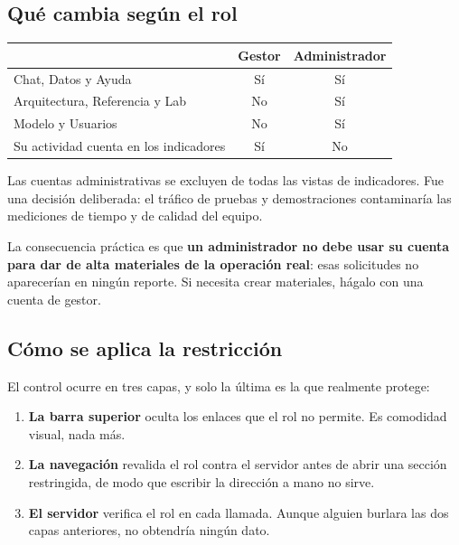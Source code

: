 \subsection{Qué cambia según el rol}

\begin{center}
\begin{tabular}{@{}lcc@{}}
\toprule
 & \textbf{Gestor} & \textbf{Administrador} \\
\midrule
Chat, Datos y Ayuda                & Sí & Sí \\
Arquitectura, Referencia y Lab     & No & Sí \\
Modelo y Usuarios                  & No & Sí \\
Su actividad cuenta en los indicadores & Sí & No \\
\bottomrule
\end{tabular}
\end{center}

\begin{aviso}
Las cuentas administrativas se excluyen de todas las vistas de indicadores. Fue
una decisión deliberada: el tráfico de pruebas y demostraciones contaminaría las
mediciones de tiempo y de calidad del equipo.

La consecuencia práctica es que \textbf{un administrador no debe usar su cuenta
para dar de alta materiales de la operación real}: esas solicitudes no
aparecerían en ningún reporte. Si necesita crear materiales, hágalo con una
cuenta de gestor.
\end{aviso}

\subsection{Cómo se aplica la restricción}

El control ocurre en tres capas, y solo la última es la que realmente protege:

\begin{enumerate}[leftmargin=*, itemsep=3pt]
  \item \textbf{La barra superior} oculta los enlaces que el rol no permite. Es
        comodidad visual, nada más.
  \item \textbf{La navegación} revalida el rol contra el servidor antes de
        abrir una sección restringida, de modo que escribir la dirección a mano
        no sirve.
  \item \textbf{El servidor} verifica el rol en cada llamada. Aunque alguien
        burlara las dos capas anteriores, no obtendría ningún dato.
\end{enumerate}


